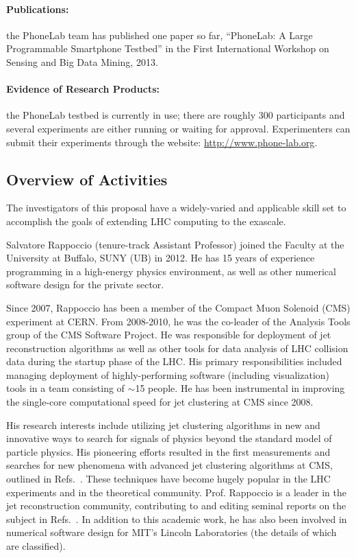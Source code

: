 \documentclass[times,11pt]{article}
\begin{document}
\paragraph{Publications:} the PhoneLab team has published one paper so far,
``PhoneLab: A Large Programmable Smartphone Testbed'' in the First International
Workshop on Sensing and Big Data Mining, 2013.

\paragraph{Evidence of Research Products:} the PhoneLab testbed is currently in
use; there are roughly 300 participants and several experiments are either
running or waiting for approval. Experimenters can submit their experiments
through the website: \url{http://www.phone-lab.org}.

\subsection{Overview of Activities}

The investigators of this proposal have a
widely-varied and applicable skill set to accomplish the goals of
extending LHC computing to the exascale. 




Salvatore Rappoccio (tenure-track Assistant Professor) joined the
Faculty at the University at Buffalo, SUNY (UB) in 2012. He has 15
years of experience programming in a
high-energy physics environment, as well as other numerical software
design for the private sector.

Since 2007, Rappoccio has been a member of the Compact Muon Solenoid
(CMS) experiment at CERN. 
From 2008-2010, he was the co-leader of the Analysis Tools group of
the CMS Software Project. He was responsible for deployment of jet
reconstruction algorithms as well as other tools for data analysis of
LHC collision data during the startup phase of the LHC. His primary
responsibilities included managing deployment of highly-performing
software (including visualization) tools in a team consisting of
$\sim$15 people. He has been instrumental in improving the single-core
computational speed for jet clustering at CMS since 2008. 

His research interests include utilizing jet clustering algorithms in
new and innovative ways to search for signals of physics beyond the
standard model of particle physics. His pioneering efforts resulted in
the first measurements and searches for new phenomena with advanced jet clustering
algorithms at CMS, outlined in 
Refs.~\cite{EXO-11-006,EXO-11-095,SMP-12-019}. These
techniques have become hugely popular in the LHC experiments and in
the theoretical community. Prof. Rappoccio is a leader in the jet
reconstruction community, contributing to and editing seminal reports
on the subject in Refs.~\cite{boost2010,boost2011,boost2012}.
In addition to this academic work, he has also been involved in
numerical software design for MIT's Lincoln Laboratories (the details
of which are classified). 
\end{document}

